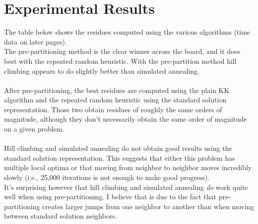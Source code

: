 \documentclass[11pt]{article}
\begin{document}
\section{Experimental Results}
The table below shows the residues computed using the various algorithms (time data on later pages). \\
The pre-partitioning method is the clear winner across the board, and it does best with the repeated random heuristic. With the pre-partition method hill climbing appears to do slightly better than simulated annealing. \\
\\
After pre-partitioning, the best residues are computed using the plain KK algorithm and the repeated random heuristic using the standard solution representation. Those two obtain residues of roughly the same orders of magnitude, although they don't necessarily obtain the same order of magnitude on a given problem. \\
\\
Hill climbing and simulated annealing do not obtain good results using the standard solution representation. This suggests that either this problem has multiple local optima or that moving from neighbor to neighbor moves incredibly slowly (i.e., 25,000 iterations is not enough to make good progress). \\
It's surprising however that hill climbing and simulated annealing \emph{do} work quite well when using pre-partitioning. I believe that is due to the fact that pre-partitioning creates larger jumps from one neighbor to another than when moving between standard solution neighbors.
\\
\\
\end{document}
